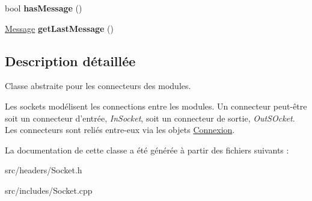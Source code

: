 \begin{DoxyCompactItemize}
\item 
\hypertarget{classSocket_afe7c9b2ef7fb3653b14f5f462293549a}{bool {\bfseries has\-Message} ()}\label{classSocket_afe7c9b2ef7fb3653b14f5f462293549a}

\item 
\hypertarget{classSocket_ad5c7a86e65e10d9c902ebcb0e2cfe824}{\hyperlink{classMessage}{Message} {\bfseries get\-Last\-Message} ()}\label{classSocket_ad5c7a86e65e10d9c902ebcb0e2cfe824}

\end{DoxyCompactItemize}


\subsection{Description détaillée}
Classe abstraite pour les connecteurs des modules. 

Les sockets modélisent les connections entre les modules. Un connecteur peut-\/être soit un connecteur d'entrée, {\itshape In\-Socket}, soit un connecteur de sortie, {\itshape Out\-S\-Ocket}. Les connecteurs sont reliés entre-\/eux via les objets \hyperlink{classConnexion}{Connexion}. 

La documentation de cette classe a été générée à partir des fichiers suivants \-:\begin{DoxyCompactItemize}
\item 
src/headers/Socket.\-h\item 
src/includes/Socket.\-cpp\end{DoxyCompactItemize}
